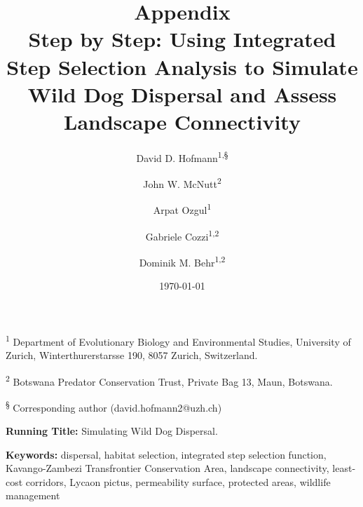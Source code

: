 \documentclass[abstract=off,10pt,a4paper,bibliography=totocnumbered]{article}
\title{\textbf{Appendix}\\ Step by Step: Using Integrated Step Selection
Analysis to Simulate Wild Dog Dispersal and Assess Landscape Connectivity}
\author{
  David D. Hofmann\textsuperscript{1,\S} \and
  John W. McNutt\textsuperscript{2} \and
  Arpat Ozgul\textsuperscript{1} \and
  Gabriele Cozzi\textsuperscript{1,2} \and
  Dominik M. Behr\textsuperscript{1,2}
}
\date{\today}
\newcommand{\beginappendix}{%
  \setcounter{table}{0}
  \renewcommand{\thetable}{S\arabic{table}}%
  \setcounter{figure}{0}
  \renewcommand{\thefigure}{S\arabic{figure}}%
  \setcounter{equation}{0}
  \renewcommand{\theequation}{Equation S\arabic{equation}}%
  \setcounter{section}{0}
  \renewcommand{\thesection}{A.\arabic{section}}%
}
\begin{document}



\maketitle

\begin{flushleft}

\vspace{0.5cm}

\textsuperscript{1} Department of Evolutionary Biology and Environmental
Studies, University of Zurich, Winterthurerstarsse 190, 8057 Zurich,
Switzerland.

\textsuperscript{2} Botswana Predator Conservation Trust, Private Bag 13, Maun,
Botswana.

\textsuperscript{\S} Corresponding author (david.hofmann2@uzh.ch)

\vspace{4cm}

\textbf{Running Title:} Simulating Wild Dog Dispersal.

\vspace{0.5cm}

\textbf{Keywords:} dispersal, habitat selection, integrated step selection
function, Kavango-Zambezi Transfrontier Conservation Area, landscape
connectivity, least-cost corridors, Lycaon pictus, permeability surface,
protected areas, wildlife management

\end{flushleft}

\newpage



\appendix
\beginappendix

\end{document}
